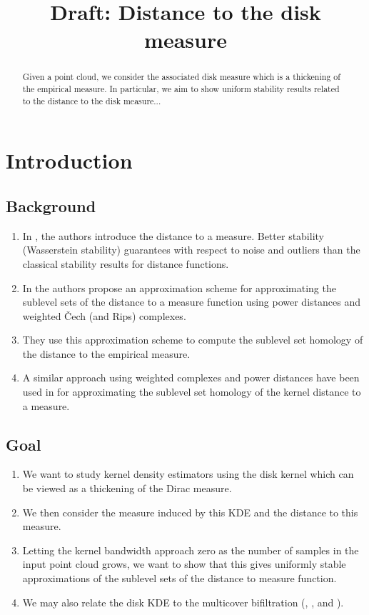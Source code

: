 \documentclass[10pt,a4paper]{article}
\title{Draft: Distance to the disk measure}
\theoremstyle{definition}
\begin{document}
	\maketitle
	\begin{abstract}
		Given a point cloud, we consider the associated disk measure which is a thickening of the empirical measure. In particular, we aim to show uniform stability results related to the distance to the disk measure...
	\end{abstract}

	\section{Introduction}
	\subsection{Background}
	\begin{enumerate}
		\item In \autocite{chazal2011geometric}, the authors introduce the distance to a measure. Better stability (Wasserstein stability) guarantees with respect to noise and outliers than the classical stability results for distance functions.
		
		\item In \autocite{Buchet2013} the authors propose an approximation scheme for approximating the sublevel sets of the distance to a measure function using power distances and weighted Čech (and Rips) complexes.
		
		\item They use this approximation scheme to compute the sublevel set homology of the distance to the empirical measure.
		
		\item A similar approach using weighted complexes and power distances have been used in \autocite{Phillips2013} for approximating the sublevel set homology of the kernel distance to a measure.
	\end{enumerate}

	\subsection{Goal}
	\begin{enumerate}
		\item We want to study kernel density estimators using the disk kernel which can be viewed as a thickening of the Dirac measure.
		\item We then consider the measure induced by this KDE and the distance to this measure.
		\item Letting the kernel bandwidth approach zero as the number of samples in the input point cloud grows, we want to show that this gives uniformly stable approximations of the sublevel sets of the distance to measure function.
		\item We may also relate the disk KDE to the multicover bifiltration (\autocite{Blumberg2020}, \autocite{corbet2021}, \autocite{sheehy2012multicover} and \autocite{edelsbrunner2021multi}).
	\end{enumerate}
\end{document}
